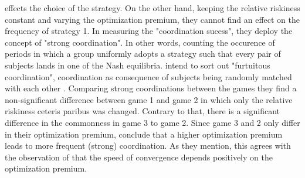 \documentclass[11pt]{article}
\begin{document}
effects the choice of the strategy. 
On the other hand, keeping the relative riskiness constant and varying the
optimization premium, they cannot find an effect on the frequency of 
strategy 1. 
In measuring the "coordination sucess", they deploy the concept of "strong
coordination". 
In other words, counting the occurence of periods in which a group
uniformly adopts a strategy such that every pair of subjects lands in one
of the Nash equilibria. \textcite{dubois_optimization_2012} intend to sort 
out "furtuitous coordination", coordination as consequence of subjects being
randomly matched with each other \parencite[373]{dubois_optimization_2012}.
Comparing strong coordinations between the games they find a non-significant 
difference between game 1 and game 2 in which only the relative riskiness 
ceteris paribus was changed. Contrary to that, there is a significant 
difference in the commonness in game 3 to game 2.
Since game 3 and 2 only differ in their optimization premium, 
\textcite{dubois_optimization_2012} conclude that a higher optimization
premium leads to more frequent (strong) coordination. 
As they mention, this agrees with the observation of 
\textcite{battalio_optimization_2001} that the speed of convergence depends 
positively on the optimization premium. 
\end{document}
